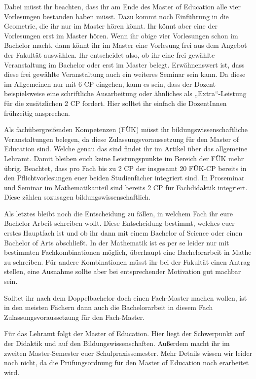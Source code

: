 Dabei müsst ihr beachten, dass ihr am Ende des Master of Education alle vier Vorlesungen bestanden haben müsst. Dazu kommt noch Einführung in die Geometrie, die ihr nur im Master hören könnt. Ihr könnt aber eine der Vorlesungen erst im Master hören. Wenn ihr obige vier Vorlesungen schon im Bachelor macht, dann könnt ihr im Master eine Vorlesung frei aus dem Angebot der Fakultät auswählen. Ihr entscheidet also, ob ihr eine frei gewählte Veranstaltung im Bachelor oder erst im Master belegt. Erwähnenswert ist, dass diese frei gewählte Veranstaltung auch ein weiteres Seminar sein kann. Da diese im Allgemeinen nur mit 6 \gls{CP} eingehen, kann es sein, dass der Dozent beispielsweise eine schriftliche Ausarbeitung oder ähnliches als „Extra“-Leistung für die zusätzlichen 2 \gls{CP} fordert. Hier solltet ihr einfach die DozentInnen frühzeitig ansprechen.

Als fachübergreifenden Kompetenzen (FÜK) müsst ihr bildungswissenschaftliche Veranstaltungen belegen, da diese Zulassungsvoraussetzung für den Master of Education sind. Welche genau das sind findet ihr im Artikel über das allgemeine Lehramt. Damit bleiben euch keine Leistungspunkte im Bereich der FÜK mehr übrig. Beachtet, dass pro Fach bis zu 2 \gls{CP} der insgesamt 20 FÜK-\gls{CP} bereits in den Pflichtvorlesungen euer beiden Studienfächer integriert sind. In Proseminar und Seminar im Mathematikanteil sind bereits 2 \gls{CP} für Fachdidaktik integriert. Diese zählen sozusagen bildungswissenschaftlich.

Als letztes bleibt noch die Entscheidung zu fällen, in welchem Fach ihr eure Bachelor-Arbeit schreiben wollt. Diese Entscheidung bestimmt, welches euer erstes Hauptfach ist und ob ihr dann mit einem Bachelor of Science oder einen Bachelor of Arts abschließt. In der Mathematik ist es per se leider nur mit bestimmten Fachkombinationen möglich, überhaupt eine Bachelorarbeit in Mathe zu schreiben. Für andere Kombinationen müsst ihr bei der Fakultät einen Antrag stellen, eine Ausnahme sollte aber bei entsprechender Motivation gut machbar sein.

Solltet ihr nach dem Doppelbachelor doch einen Fach-Master machen wollen, ist in den meisten Fächern dann auch die Bachelorarbeit in diesem Fach Zulassungsvoraussetzung für den Fach-Master.

Für das Lehramt folgt der Master of Education. Hier liegt der Schwerpunkt auf der Didaktik und auf den Bildungswissenschaften. Außerdem macht ihr im zweiten Master-Semester euer Schulpraxissemester. Mehr Details wissen wir leider noch nicht, da die Prüfungsordnung für den Master of Education noch erarbeitet wird.
